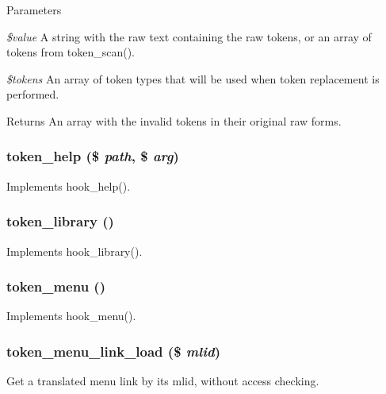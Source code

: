 \begin{DoxyParams}{Parameters}
\item[{\em \$value}]A string with the raw text containing the raw tokens, or an array of tokens from token\_\-scan(). \item[{\em \$tokens}]An array of token types that will be used when token replacement is performed. \end{DoxyParams}
\begin{DoxyReturn}{Returns}
An array with the invalid tokens in their original raw forms. 
\end{DoxyReturn}
\hypertarget{token_8module_a9894cb2ff5f36ce4034e51c75da76de0}{
\subsubsection[{token\_\-help}]{\setlength{\rightskip}{0pt plus 5cm}token\_\-help (\$ {\em path}, \/  \$ {\em arg})}}
\label{token_8module_a9894cb2ff5f36ce4034e51c75da76de0}
Implements hook\_\-help(). \hypertarget{token_8module_afabac2b6ac5ef102cd598b1b5e940f78}{
\subsubsection[{token\_\-library}]{\setlength{\rightskip}{0pt plus 5cm}token\_\-library ()}}
\label{token_8module_afabac2b6ac5ef102cd598b1b5e940f78}
Implements hook\_\-library(). \hypertarget{token_8module_a91896ab13a2135f6efe2fa63697769b2}{
\subsubsection[{token\_\-menu}]{\setlength{\rightskip}{0pt plus 5cm}token\_\-menu ()}}
\label{token_8module_a91896ab13a2135f6efe2fa63697769b2}
Implements hook\_\-menu(). \hypertarget{token_8module_aa10d2e27b2947c29152b40bc0bb3b495}{
\subsubsection[{token\_\-menu\_\-link\_\-load}]{\setlength{\rightskip}{0pt plus 5cm}token\_\-menu\_\-link\_\-load (\$ {\em mlid})}}
\label{token_8module_aa10d2e27b2947c29152b40bc0bb3b495}
Get a translated menu link by its mlid, without access checking.

